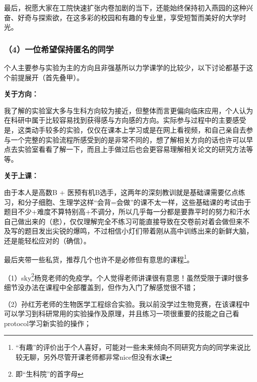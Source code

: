 \documentclass[11pt,oneside]{book}
\begin{document}
\vspace{10pt}

最后，祝愿大家在工院快速扩张内卷加剧的当下，还能始终保持初入燕园的这种兴奋、好奇与探索欲，在这多彩的校园和有趣的专业里，享受短暂而美好的大学时光。

\subsubsection{（4）一位希望保持匿名的同学}

个人主要参与实验为主的方向且非强基所以力学课学的比较少，以下讨论都基于这个前提展开（首先叠甲）。

\vspace{10pt}

\textbf{关于方向：}

我了解的实验室大多与生科方向较为接近，但整体而言更偏向临床应用，个人认为在科研中属于比较容易找到获得感与方向感的方向。实际参与过程中的主要感受是，这类动手较多的实验，仅仅在课本上学习或是在网上看视频，和自己亲自去参与一个完整的实验流程所感受到的是非常不同的，想了解相关方向的话也许可以早点去实验室看看了解一下，而且上手做过后也会更容易理解相关论文的研究方法等等。

\vspace{10pt}

\textbf{关于上课：}

由于本人是高数B + 医预有机B选手，这两年的深刻教训就是基础课需要亿点练习，和分子细胞、生理学这样“会背=会做”的课不太一样，这些基础课的考试由于题目不少+难度不算特别高+不调分，所以几乎每一分都是要靠平时的努力和汗水自己做出来的（悲），仅仅理解完全不练习可能直接导致在交卷前对着会做但来不及写的题目发出尖锐的爆鸣，不过相信小灯们带着刚从高中训练出来的新鲜大脑，还是能轻松应对的（确信）。

\vspace{10pt}

最后夹带一些私货，推荐几个也许不是必修但有意思的课程\footnote{“有趣”的评价出于个人喜好，可能对一些未来倾向不同研究方向的同学来说比较无聊，另外尽管开课老师都非常nice但没有水课}。

\vspace{10pt}

（1）sky\footnote{即“生科院”的首字母}杨竞老师的免疫学。个人觉得老师讲课很有意思！虽然受限于课时很多细节没办法在课程中全部覆盖到，但作为入门了解感觉很不错；

\vspace{10pt}

（2）孙红芳老师的生物医学工程综合实验。我以前没学过生物竞赛，在该课程中可以学习到科研常用的实验操作及原理，并且练习一项很重要的技能之自己看protocol学习新实验的操作；
\end{document}
